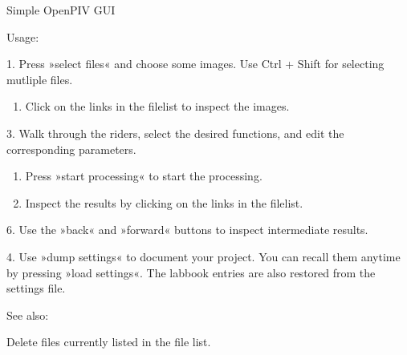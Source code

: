 \documentclass[letterpaper,10pt,english]{sphinxmanual}
\begin{document}
\begin{fulllineitems}
\label{\detokenize{openpivgui:openpivgui.OpenPivGui.OpenPivGui}}
Simple OpenPIV GUI

Usage:

1. Press »select files« and choose some images.
Use Ctrl + Shift for selecting mutliple files.
\begin{enumerate}
%
\setcounter{enumi}{1}
\item {} 
Click on the links in the file\sphinxhyphen{}list to inspect the images.

\end{enumerate}

3. Walk through the riders, select the desired functions,
and edit the corresponding parameters.
\begin{enumerate}
%
\setcounter{enumi}{3}
\item {} 
Press »start processing« to start the processing.

\item {} 
Inspect the results by clicking on the links in the file\sphinxhyphen{}list.

\end{enumerate}

6. Use the »back« and »forward« buttons to inspect
intermediate results.

4. Use »dump settings« to document your project. You can recall them
anytime by pressing »load settings«. The lab\sphinxhyphen{}book entries
are also restored from the settings file.

See also:


\begin{fulllineitems}
\label{\detokenize{openpivgui:openpivgui.OpenPivGui.OpenPivGui.delete_files}}
Delete files currently listed in the file list.

\end{fulllineitems}



\end{fulllineitems}
\end{document}
